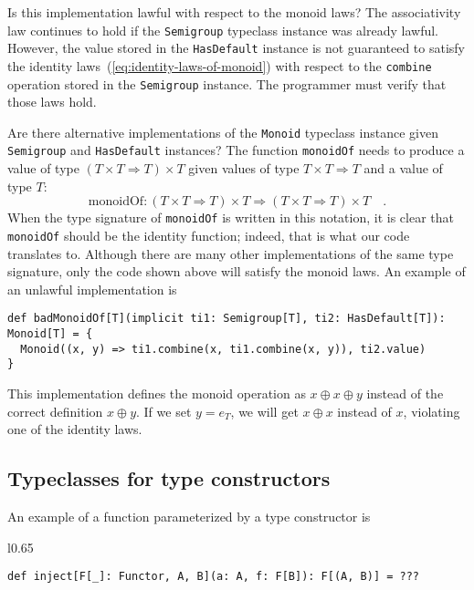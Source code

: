 Is this implementation lawful with respect to the monoid laws? The
associativity law continues to hold if the \lstinline!Semigroup!
typeclass instance was already lawful. However, the value stored in
the \lstinline!HasDefault! instance is not guaranteed to satisfy
the identity laws~(\ref{eq:identity-laws-of-monoid}) with respect
to the \lstinline!combine! operation stored in the \lstinline!Semigroup!
instance. The programmer must verify that those laws hold.

Are there alternative implementations of the \lstinline!Monoid! typeclass
instance given \lstinline!Semigroup! and \lstinline!HasDefault!
instances? The function \lstinline!monoidOf! needs to produce a value
of type $\left(T\times T\Rightarrow T\right)\times T$ given values
of type $T\times T\Rightarrow T$ and a value of type $T$:
\[
\text{monoidOf}:\left(T\times T\Rightarrow T\right)\times T\Rightarrow\left(T\times T\Rightarrow T\right)\times T\quad.
\]
When the type signature of \lstinline!monoidOf! is written in this
notation, it is clear that \lstinline!monoidOf! should be the identity
function; indeed, that is what our code translates to. Although there
are many other implementations of the same type signature, only the
code shown above will satisfy the monoid laws. An example of an unlawful
implementation is
\begin{lstlisting}
def badMonoidOf[T](implicit ti1: Semigroup[T], ti2: HasDefault[T]): Monoid[T] = {
  Monoid((x, y) => ti1.combine(x, ti1.combine(x, y)), ti2.value) 
}
\end{lstlisting}
This implementation defines the monoid operation as $x\oplus x\oplus y$
instead of the correct definition $x\oplus y$. If we set $y=e_{T}$,
we will get $x\oplus x$ instead of $x$, violating one of the identity
laws.

\subsection{Typeclasses for type constructors}

An example of a function parameterized by a type constructor is

\begin{wrapfigure}{l}{0.65\columnwidth}%
\vspace{-0.85\baselineskip}
\begin{lstlisting}
def inject[F[_]: Functor, A, B](a: A, f: F[B]): F[(A, B)] = ???
\end{lstlisting}
\vspace{-0.85\baselineskip}
\end{wrapfigure}%

